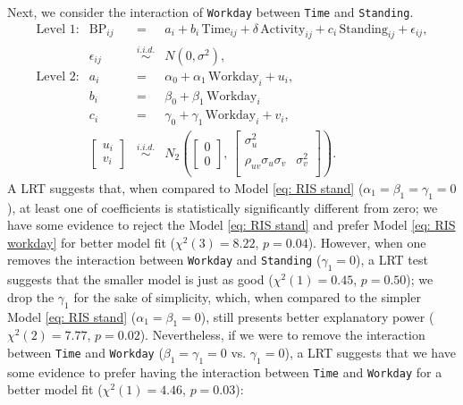 \documentclass[12pt,twoside,letterpaper]{article}
\theoremstyle{definition}
\theoremstyle{definition}
\begin{document}
Next, we consider the interaction of \texttt{Workday} between \texttt{Time} and \texttt{Standing}. 
\begin{equation}\label{eq: RIS workday}
    \begin{array}{rrcll}
        \text{Level 1}: & \text{BP}_{ij} &=& a_i + b_i\, \text{Time}_{ij} + \delta \, \text{Activity}_{ij} + c_i\, \text{Standing}_{ij} + \epsilon_{ij}, \\[0.5ex]
         & \epsilon_{ij} &\overset{i.i.d.}{\sim}& N(0, \sigma^2), \\[0.5ex]
        \text{Level 2}: & a_i &=& \alpha_0 + \alpha_1\, \text{Workday}_i + u_i, \\[0.5ex]
        & b_i &=& \beta_0 + \beta_1\, \text{Workday}_i \\[0.5ex]
        & c_i &=& \gamma_0 + \gamma_1\, \text{Workday}_i + v_i, \\[1ex]
         & \begin{bmatrix} u_i \\ v_i 
         \end{bmatrix} &\overset{i.i.d.}{\sim}& N_2\left(\begin{bmatrix} 0 \\ 0 \end{bmatrix},\, \begin{bmatrix} \sigma_u^2 &\\ 
         \rho_{uv}\sigma_u\sigma_v & \sigma_v^2\\
         \end{bmatrix} \right).
    \end{array}
\end{equation}
A LRT suggests that, when compared to Model \ref{eq: RIS stand} ($\alpha_1 = \beta_1 = \gamma_1 = 0$), at least one of coefficients is statistically significantly different from zero; we have some evidence to reject the Model \ref{eq: RIS stand} and prefer Model \ref{eq: RIS workday} for better model fit ($\chi^2 (3) = 8.22$, $p = 0.04$). However, when one removes the interaction between \texttt{Workday} and \texttt{Standing} ($\gamma_1 = 0$), a LRT test suggests that the smaller model is just as good ($\chi^2 (1) = 0.45$, $p = 0.50$); we drop the $\gamma_1$ for the sake of simplicity, which, when compared to the simpler Model \ref{eq: RIS stand} ($\alpha_1 = \beta_1 = 0$), still presents better explanatory power ($\chi^2 (2) = 7.77$, $p = 0.02$). Nevertheless, if we were to remove the interaction between \texttt{Time} and \texttt{Workday} ($\beta_1 = \gamma_1 = 0$ vs. $\gamma_1 = 0$), a LRT suggests that we have some evidence to prefer having the interaction between \texttt{Time} and \texttt{Workday} for a better model fit ($\chi^2 (1) = 4.46$, $p = 0.03$):
\end{document}
